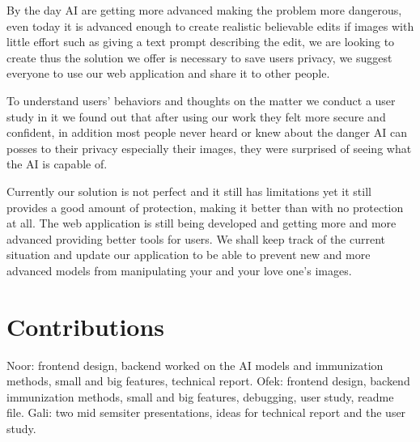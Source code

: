 \documentclass[sigconf]{acmart}
\begin{document}
By the day AI are getting more advanced making the problem more dangerous, even today it is advanced enough to create realistic believable edits if images with little effort such as giving a text prompt describing the edit, we are looking to create thus the solution we offer is necessary to save users privacy, we suggest everyone to use our web application and share it to other people.

To understand users' behaviors and thoughts on the matter we conduct a user study in it we found out that after using our work they felt more secure and confident, in addition most people never heard or knew about the danger AI can posses to their privacy especially their images, they were surprised of seeing what the AI is capable of.

Currently our solution is not perfect and it still has limitations yet it still provides a good amount of protection, making it better than with no protection at all. The web application is still being developed and getting more and more advanced providing better tools for users. We shall keep track of the current situation and update our application to be able to prevent new and more advanced models from manipulating your and your love one's images. 

\section{Contributions}

Noor: frontend design, backend worked on the AI models and immunization methods, small and big features, technical report.
\newline
\newline
Ofek: frontend design, backend immunization methods, small and big features, debugging, user study, readme file.
\newline
\newline
Gali: two mid semsiter presentations, ideas for technical report and the user study.



\end{document}

